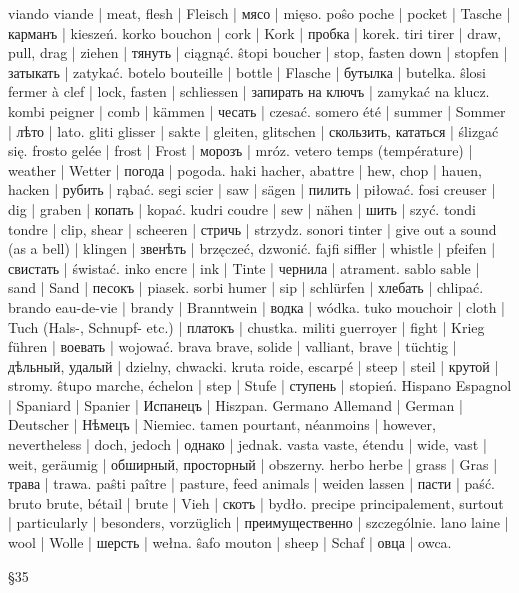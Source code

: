 viando viande | meat, flesh | Fleisch | мясо | mięso.
poŝo poche | pocket | Tasche | карманъ | kieszeń.
korko bouchon | cork | Kork | пробка | korek.
tiri tirer | draw, pull, drag | ziehen | тянуть | ciągnąć.
ŝtopi boucher | stop, fasten down | stopfen | затыкать | zatykać.
botelo bouteille | bottle | Flasche | бутылка | butelka.
ŝlosi fermer à clef | lock, fasten | schliessen | запирать на ключъ | zamykać na klucz.
kombi peigner | comb | kämmen | чесать | czesać.
somero été | summer | Sommer | лѣто | lato.
gliti glisser | sakte | gleiten, glitschen | скользить, кататься | ślizgać się.
frosto gelée | frost | Frost | морозъ | mróz.
vetero temps (température) | weather | Wetter | погода | pogoda.
haki hacher, abattre | hew, chop | hauen, hacken | рубить | rąbać.
segi scier | saw | sägen | пилить | piłować.
fosi creuser | dig | graben | копать | kopać.
kudri coudre | sew | nähen | шить | szyć.
tondi tondre | clip, shear | scheeren | стричь | strzydz.
sonori tinter | give out a sound (as a bell) | klingen | звенѣть | brzęczeć, dzwonić.
fajfi siffler | whistle | pfeifen | свистать | świstać.
inko encre | ink | Tinte | чернила | atrament.
sablo sable | sand | Sand | песокъ | piasek.
sorbi humer | sip | schlürfen | хлебать | chlipać.
brando eau-de-vie | brandy | Branntwein | водка | wódka.
tuko mouchoir | cloth | Tuch (Hals-, Schnupf- etc.) | платокъ | chustka.
militi guerroyer | fight | Krieg führen | воевать | wojować.
brava brave, solide | valliant, brave | tüchtig | дѣльный, удалый | dzielny, chwacki.
kruta roide, escarpé | steep | steil | крутой | stromy.
ŝtupo marche, échelon | step | Stufe | ступень | stopień.
Hispano Espagnol | Spaniard | Spanier | Испанецъ | Hiszpan.
Germano Allemand | German | Deutscher | Нѣмецъ | Niemiec.
tamen pourtant, néanmoins | however, nevertheless | doch, jedoch | однако | jednak.
vasta vaste, étendu | wide, vast | weit, geräumig | обширный, просторный | obszerny.
herbo herbe | grass | Gras | трава | trawa.
paŝti paître | pasture, feed animals | weiden lassen | пасти | paść.
bruto brute, bétail | brute | Vieh | скотъ | bydło.
precipe principalement, surtout | particularly | besonders, vorzüglich | преимущественно | szczególnie.
lano laine | wool | Wolle | шерсть | wełna.
ŝafo mouton | sheep | Schaf | овца | owca.

§35

